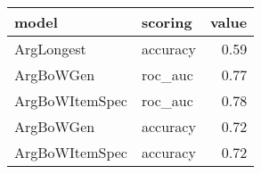 \begin{tabular}{llr}
\toprule
          model &   scoring &  value \\
\midrule
     ArgLongest &  accuracy &   0.59 \\
      ArgBoWGen &   roc\_auc &   0.77 \\
 ArgBoWItemSpec &   roc\_auc &   0.78 \\
      ArgBoWGen &  accuracy &   0.72 \\
 ArgBoWItemSpec &  accuracy &   0.72 \\
\bottomrule
\end{tabular}
